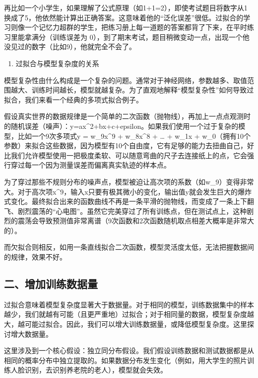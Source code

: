 再比如一个小学生，如果理解了公式原理（如1+1=2），即使考试题目将数字从1换成了5，他依然能计算出正确答案。这意味着他的``泛化误差''很低。过拟合的学习则像一个记忆力超群的学生，把练习册上每一道题的答案都背了下来，在平时练习里能拿满分（训练误差为 0），到了期末考试，题目稍微变动一点，出现一个他没见过的数字（比如9），他就完全不会了。

\begin{enumerate}
\def\labelenumi{\arabic{enumi}.}
\setcounter{enumi}{2}
\tightlist
\item
  过拟合与模型复杂度的关系
\end{enumerate}

模型复杂性由什么构成是一个复杂的问题。通常对于神经网络，参数越多、取值范围越大、训练时间越长，模型就越复杂。为了直观地解释``模型复杂性''如何导致过拟合，我们来看一个经典的多项式拟合例子。

假设真实世界的数据规律是一个简单的二次函数（抛物线），再加上一点点观测时的随机误差（噪声）：y=ax\^{}2+bx+c+epsilon。如果我们使用一个过于复杂的模型，比如一个9次多项式y = w\_9x\^{}9 + w\_8x\^{}8 + \ldots{} + w\_1x + w\_0（拥有10个参数）来拟合这些数据，因为模型有10个自由度，它有足够的能力去扭曲自己，好比我们允许模型使用一把极度柔软、可以随意弯曲的尺子去连接纸上的点，它会强行穿过每一个因为测量误差而偏离真实轨迹的样本点。

为了穿过那些不规则分布的噪声点，模型被迫让高次项的系数（如w\_9）变得非常大。对于高次项x\^{}9，输入x只要有极其微小的变化，输出值y就会发生巨大的爆炸式变化。最终拟合出来的函数曲线不再是一条平滑的抛物线，而变成了一条上下翻飞、剧烈震荡的``心电图''。虽然它完美穿过了所有训练点，但在测试点上，这种剧烈的震荡会导致预测值非常离谱（9次函数和2次函数随机取点相差大概率是非常大的）。

而欠拟合则相反，如用一条直线拟合二次函数，模型灵活度太低，无法把握数据间的规律，效果不好。

\hypertarget{ux4e8cux589eux52a0ux8badux7ec3ux6570ux636eux91cf}{%
\subsection{二、增加训练数据量}\label{ux4e8cux589eux52a0ux8badux7ec3ux6570ux636eux91cf}}

过拟合意味着模型复杂度显著大于数据量。对于相同的模型，训练数据集中的样本越少，我们就越有可能（且更严重地）过拟合；对于相同量的数据，模型复杂度越大，越可能过拟合。因此，我们可以增大训练数据量，或降低模型复杂度。这里探讨增大数据量。

这里涉及到一个核心假设：独立同分布假设。我们假设训练数据和测试数据都是从相同的概率分布中独立提取的。如果数据分布发生变化（例如，用大学生的照片训练人脸识别，去识别养老院的老人），模型就会失效。

